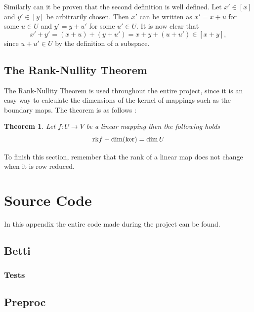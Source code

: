\documentclass[11pt,a4paper,twoside]{report}
\newtheorem{mythm}{Theorem}[chapter]
\begin{document}
Similarly can it be proven that the second definition is well defined. Let $x'\in[x]$ and $y'\in [y]$ be arbitrarily chosen. Then $x'$ can be written as $x'=x+u$ for some $u\in U$ and $y' = y+u'$ for some $u'\in U$. It is now clear that
\begin{equation*}
x'+y'=(x+u)+(y+u')=x+y+(u+u')\in [x+y],
\end{equation*}
since $u+u'\in U$ by the definition of a subspace.


\section{The Rank-Nullity Theorem}
The Rank-Nullity Theorem is used throughout the entire project, since it is an easy way to calculate the dimensions of the kernel of mappings such as the boundary maps. The theorem is as follows \cite[p. 109]{LinAlg}: 
\begin{mythm}\label{thm:rank_nullity}
Let $f:U\to V$ be a linear mapping then the following holds
\begin{equation*}
\textnormal{rk}f+\dim(\ker)=\dim U
\end{equation*}
\end{mythm}

To finish this section, remember that the rank of a linear map does not change when it is row reduced.

\chapter{Source Code}\label{ch:source_code}
In this appendix the entire code made during the project can be found.
\section{Betti}


\newpage

\newpage




\newpage

\subsection{Tests}



\newpage

\newpage
\section{Preproc}


\end{document}
